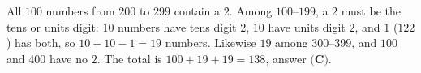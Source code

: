 All $100$ numbers from $200$ to $299$ contain a $2$. Among $100$--$199$, a $2$ must be the tens or units digit: $10$ numbers have tens digit $2$, $10$ have units digit $2$, and $1$ ($122$) has both, so $10+10-1=19$ numbers. Likewise $19$ among $300$--$399$, and $100$ and $400$ have no $2$. The total is $100+19+19=\boxed{138}$, answer $\textbf{(C)}$.
